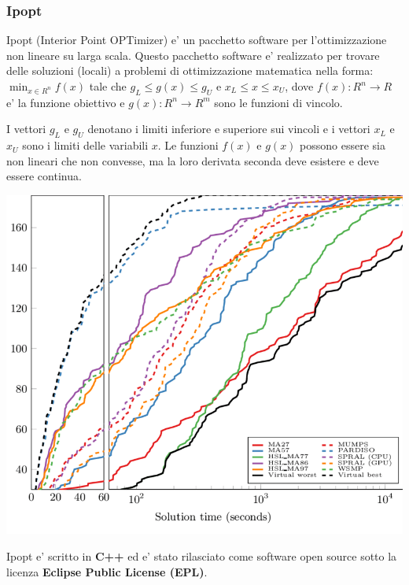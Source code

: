 \subsubsection{Ipopt}
Ipopt (Interior Point OPTimizer) \cite{Wächter2006} e' un pacchetto software per 
l'ottimizzazione non lineare su larga scala. Questo pacchetto software e' realizzato 
per trovare delle soluzioni (locali) a problemi di ottimizzazione matematica nella forma:
$\min_{x \in R^n} f(x)$ tale che $g_L \leq g(x) \leq g_U$ e $x_L \leq x \leq x_U$, dove 
$f(x): R^n \rightarrow R$ e' la funzione obiettivo e $g(x): R^n \rightarrow R^m$ 
sono le funzioni di vincolo.

I vettori $g_L$ e $g_U$ denotano i limiti inferiore e superiore sui vincoli e i vettori
$x_L$ e $x_U$ sono i limiti delle variabili $x$. Le funzioni $f(x)$ e $g(x)$ possono essere 
sia non lineari che non convesse, ma la loro derivata seconda deve esistere e deve essere 
continua.

\begin{minipage}{\linewidth}
    \centering
    \includegraphics[width=\textwidth]{img/Comparison-of-Ipopt-performance-over-various-linear-solvers-using-the-two-dimensional.png}
    \label{fig:Ipopt_solver}
\end{minipage}

Ipopt e' scritto in \textbf{C++} ed e' stato rilasciato come software open source sotto la licenza \textbf{Eclipse Public License (EPL)}.
